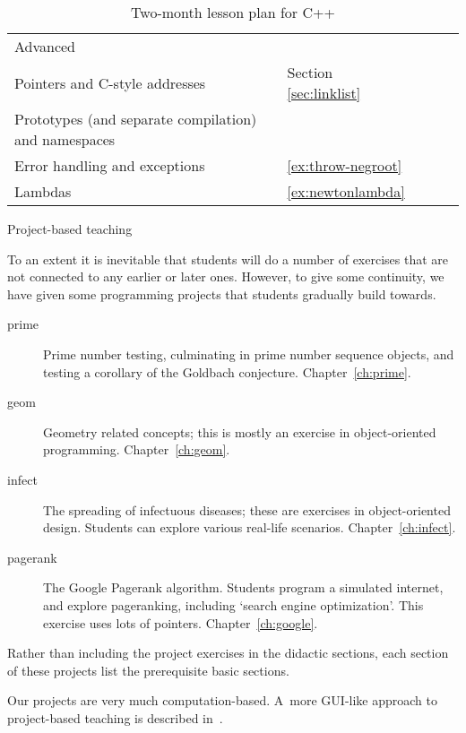 \begin{table}[ht]
\begin{tabular}{|l|p{\colwidth}|p{\colwidth}p{\colwidth}p{\colwidth}p{\colwidth}|}
        &&&&\\
    \hline
    \multicolumn{2}{|p{2in}|}{Advanced}\\
    \hline
    \multicolumn{2}{|p{2in}|}{Pointers and C-style addresses}
        &Section \ref{sec:linklist}&&&\\
    \multicolumn{2}{|p{2in}|}{Prototypes (and separate compilation)
      and namespaces}
        &&&&\\
    \multicolumn{2}{|p{2in}|}{Error handling and exceptions}
        &\ref{ex:throw-negroot}&&&\\
    \multicolumn{2}{|p{2in}|}{Lambdas}
        &\ref{ex:newtonlambda}&&&\\
    \hline
  \end{tabular}
  \caption{Two-month lesson plan for C++}
  \label{tab:c++plan}
\end{table}

 {Project-based teaching}

To an extent it is inevitable that students will do a number of
exercises that are not connected to any earlier or later ones.
However, to give some continuity, we have given some programming
projects that students gradually build towards.

\begin{description}
\item[prime] Prime number testing, culminating in prime number
  sequence objects, and testing a corollary of the Goldbach
  conjecture. Chapter~\ref{ch:prime}.
\item[geom] Geometry related concepts; this is mostly an exercise in
  object-oriented programming. Chapter~\ref{ch:geom}.
\item[infect] The spreading of infectuous diseases; these are
  exercises in object-oriented design. Students can explore various
  real-life scenarios. Chapter~\ref{ch:infect}.
\item[pagerank] The Google Pagerank algorithm. Students program a
  simulated internet, and explore pageranking, including `search
  engine optimization'. This exercise uses lots of
  pointers. Chapter~\ref{ch:google}.
\end{description}

Rather than including the project exercises in the didactic sections,
each section of these projects list the prerequisite basic sections.

Our projects are very much computation-based. A~more GUI-like approach
to project-based teaching is described
in~\cite{Chen:2012:project-cpp}.

